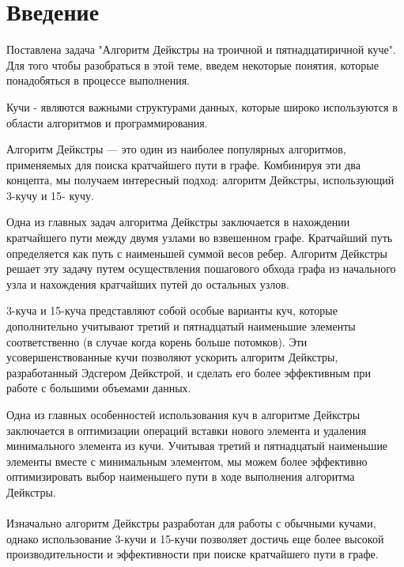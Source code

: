 \documentclass[a4paper, 12pt]{article}
\theoremstyle{definition}
\begin{document}
	\tableofcontents{}
	\clearpage
	
	\section{Введение}
	
	Поставлена задача "Алгоритм Дейкстры на троичной и пятнадцатиричной куче". Для того чтобы разобраться в этой теме, введем некоторые понятия, которые понадобяться в процессе выполнения. \newline
	
	Кучи - являются важными структурами данных, которые широко используются в области алгоритмов и программирования. \newline
	
	Алгоритм Дейкстры —
	это один из наиболее популярных алгоритмов, применяемых для поиска
	кратчайшего пути в графе. Комбинируя эти два концепта, мы получаем
	интересный подход: алгоритм Дейкстры, использующий 3-кучу и 15-
	кучу.\newline
	
	Одна из главных задач алгоритма Дейкстры заключается в нахождении
	кратчайшего пути между двумя узлами во взвешенном графе. Кратчайший
	путь определяется как путь с наименьшей суммой весов ребер. Алгоритм
	Дейкстры решает эту задачу путем осуществления пошагового обхода
	графа из начального узла и нахождения кратчайших путей до остальных
	узлов. \newline
	
	3-куча и 15-куча представляют собой
	особые варианты куч, которые дополнительно учитывают третий и пятнадцатый
	наименьшие элементы соответственно (в случае когда корень больше потомков). Эти усовершенствованные кучи
	позволяют ускорить алгоритм Дейкстры, разработанный Эдсгером Дейкстрой,
	и сделать его более эффективным при работе с большими объемами
	данных. \newline
	
	Одна из главных особенностей использования куч в алгоритме Дейкстры
	заключается в оптимизации операций вставки нового элемента и удаления
	минимального элемента из кучи. Учитывая третий и пятнадцатый наименьшие
	элементы вместе с минимальным элементом, мы можем более эффективно
	оптимизировать выбор наименьшего пути в ходе выполнения алгоритма
	Дейкстры.\\ \\
	Изначально алгоритм Дейкстры разработан для работы с обычными
	кучами, однако использование 3-кучи и 15-кучи позволяет достичь еще
	более высокой производительности и эффективности при поиске кратчайшего
	пути в графе. \newline
	
\end{document}
